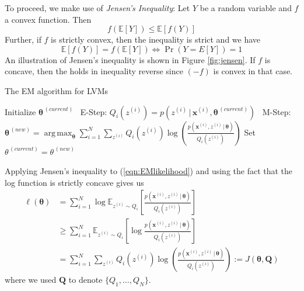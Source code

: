 \documentclass[final,3p,times,twocolumn]{elsarticle}
\DeclareMathOperator*{\argmax}{arg\,max}
\let\bs\boldsymbol
\begin{document}
To proceed, we make use of \emph{Jensen's Inequality}:
Let $Y$ be a random variable and $f$ a convex function. Then
\begin{equation}
f\left(\mathbb{E}[Y]\right) \leq \mathbb{E}\left[f(Y)\right]
\label{eqn:jensen}
\end{equation}
Further, if $f$ is strictly convex, then the inequality is strict and we have
\begin{equation}
\mathbb{E}\left[f(Y)\right] = f\left(\mathbb{E}[Y]\right) \iff \Pr\left(Y = E[Y]\right) = 1
\label{eqn:jensentight}
\end{equation}
An illustration of Jensen's inequality is shown in Figure \ref{fig:jensen}.
If $f$ is concave, then the holds in inequality reverse since $(-f)$ is convex in that case. 

\begin{algorithm}
\caption{The EM algorithm for LVMs}
\label{alg:EM}
\begin{algorithmic}[1]
\State Initialize $\bs\theta^{\,(current)}$
\Statex\Repeat
\Statex \quad\, E-Step:
\State $Q_i(z^{(i)}) = p(z^{(i)}\,|\,\bs x^{(i)},\bs\theta^{\,(current)})$
\EndFor
\Statex\Statex \quad\, M-Step:
\State $\bs\theta^{\,(new)} = \argmax_{\bs\theta}\sum_{i=1}^N \sum_{z^{(i)}} Q_i(z^{(i)}) \log \left( \frac{p(\bs x^{(i)},z^{(i)}\,|\,\bs\theta)}{Q_i(z^{(i)})}\right)$
\State Set $\theta^{\,(current)} = \theta^{\,(new)}$
\Statex\State\Return{  $\bs\theta^{\,(current)},z^{(1)}, \dots, z^{(N)}$}
\end{algorithmic}
\end{algorithm}

Applying Jensen's inequality to (\ref{eqn:EMlikelihood}) and using the fact that the log function is strictly concave gives us
\begin{equation}
\begin{split}
\ell(\bs\theta) &=  \sum_{i=1}^N \log \mathbb{E}_{z^{(i)} \sim Q_i}\left[\frac{p(\bs x^{(i)},z^{(i)}\,|\,\bs\theta)}{Q_i(z^{(i)})}\right]\\
&\geq \sum_{i=1}^N \mathbb{E}_{z^{(i)} \sim Q_i}\left[\log \frac{p(\bs x^{(i)},z^{(i)}\,|\,\bs\theta)}{Q_i(z^{(i)})}\right]\\ 
&= \sum_{i=1}^N \sum_{z^{(i)}} Q_i(z^{(i)}) \log \left(\frac{p(\bs x^{(i)},z^{(i)}\,|\,\bs\theta)}{Q_i(z^{(i)})}\right) := J(\bs\theta,\bs Q)
\end{split}
\end{equation}
where we used $\bs Q$ to denote $\{Q_1,\dots,Q_N\}$.
\end{document}
